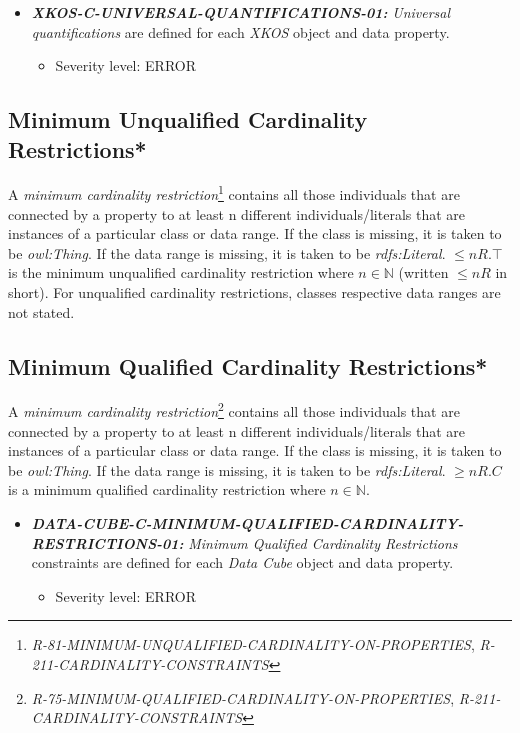\documentclass{llncs}
\begin{document}
\begin{itemize}
	\item \textbf{{\em XKOS-C-UNIVERSAL-QUANTIFICATIONS-01:}}
	\emph{Universal quantifications} are defined for each \emph{XKOS} object and data property.
	\begin{itemize}
		\item Severity level: ERROR
	\end{itemize}
\end{itemize}

\subsection{Minimum Unqualified Cardinality Restrictions*}

A \emph{minimum cardinality restriction}\footnote{{\em R-81-MINIMUM-UNQUALIFIED-CARDINALITY-ON-PROPERTIES}, {\em R-211-CARDINALITY-CONSTRAINTS}} contains all those individuals that are connected by a property to at least n different individuals/literals 
that are instances of a particular class or data range. If the class is missing, it is taken to be \emph{owl:Thing}. 
If the data range is missing, it is taken to be \emph{rdfs:Literal}.
$\leq n R. \top$ is the minimum unqualified cardinality restriction where $n \in \mathbb{N}$ (written $\leq  n R$ in short).
For unqualified cardinality restrictions, classes respective data ranges are not stated.

\subsection{Minimum Qualified Cardinality Restrictions*}

A \emph{minimum cardinality restriction}\footnote{{\em R-75-MINIMUM-QUALIFIED-CARDINALITY-ON-PROPERTIES}, {\em R-211-CARDINALITY-CONSTRAINTS}} contains all those individuals that are connected by a property to at least n different individuals/literals 
that are instances of a particular class or data range. If the class is missing, it is taken to be \emph{owl:Thing}. 
If the data range is missing, it is taken to be \emph{rdfs:Literal}.
$\geq n R. C$ is a minimum qualified cardinality restriction where $n \in \mathbb{N}$.

\begin{itemize}
	\item \textbf{{\em DATA-CUBE-C-MINIMUM-QUALIFIED-CARDINALITY-RESTRICTIONS-01:}}
	{\em Minimum Qualified Cardinality Restrictions} constraints are defined for each \emph{Data Cube} object and data property.
	\begin{itemize}
		\item Severity level: ERROR
	\end{itemize}
\end{itemize}
\end{document}
